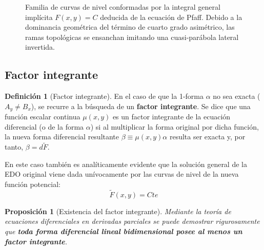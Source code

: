 \documentclass[11pt,a4paper]{article}
\theoremstyle{definition}
\newtheorem{definition}{Definición}[section]
\theoremstyle{plain}
\newtheorem{proposition}{Proposición}[section]
\begin{document}
\begin{tcolorbox}
\begin{figure}[H]
    \caption{Familia de curvas de nivel conformadas por la integral general implícita $F(x,y) = C$ deducida de la ecuación de Pfaff. Debido a la dominancia geométrica del término de cuarto grado asimétrico, las ramas topológicas se ensanchan imitando una cuasi-parábola lateral invertida.}
\end{figure}
\end{tcolorbox}

\subsection{Factor integrante}

\begin{definition}[Factor integrante]
En el caso de que la 1-forma $\alpha$ no sea exacta ($A_y \neq B_x$), se recurre a la búsqueda de un \textbf{factor integrante}. Se dice que una función escalar continua $\mu(x,y)$ es un factor integrante de la ecuación diferencial (o de la forma $\alpha$) si al multiplicar la forma original por dicha función, la nueva forma diferencial resultante $\beta \equiv \mu(x,y)\alpha$ resulta ser exacta y, por tanto, $\beta = d\tilde{F}$.
\end{definition}

En este caso también es analíticamente evidente que la solución general de la EDO original viene dada unívocamente por las curvas de nivel de la nueva función potencial:
$$ \tilde{F}(x,y) = Cte $$

\begin{proposition}[Existencia del factor integrante]
Mediante la teoría de ecuaciones diferenciales en derivadas parciales se puede demostrar rigurosamente que \textbf{toda forma diferencial lineal bidimensional posee al menos un factor integrante}.
\end{proposition}
\end{document}
